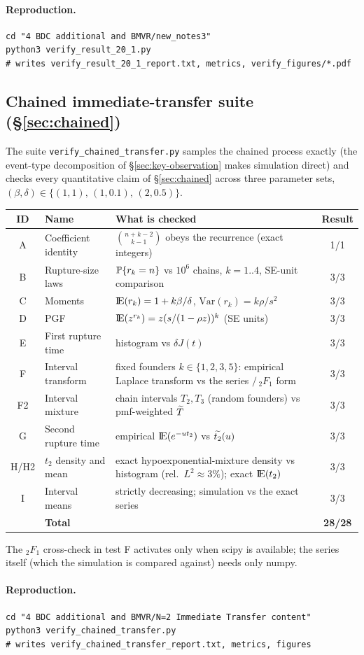 \paragraph{Reproduction.}
\begin{verbatim}
cd "4 BDC additional and BMVR/new_notes3"
python3 verify_result_20_1.py
# writes verify_result_20_1_report.txt, metrics, verify_figures/*.pdf
\end{verbatim}

\subsection{Chained immediate-transfer suite (\S\ref{sec:chained})}

The suite \texttt{verify\_chained\_transfer.py} samples the chained process
exactly (the event-type decomposition of \S\ref{sec:key-observation} makes
simulation direct) and checks every quantitative claim of
\S\ref{sec:chained} across three parameter sets,
$(\beta,\delta)\in\{(1,1),\,(1,0.1),\,(2,0.5)\}$.

\begin{center}
\renewcommand{\arraystretch}{1.2}
\small
\begin{tabular}{@{}clp{}c@{}}
\toprule
ID & Name & What is checked & Result \\
\midrule
A & Coefficient identity &
  $\binom{n+k-2}{k-1}$ obeys the recurrence (exact integers) & 1/1 \\
B & Rupture-size laws &
  $\mathbb{P}\!\left\{r_k=n\right\}$ vs $10^6$ chains, $k=1..4$, SE-unit comparison & 3/3 \\
C & Moments & ${\rm I}\!{\rm E}(r_k)=1+k\beta/\delta$, $\mathrm{Var}(r_k)=k\rho/s^2$ & 3/3 \\
D & PGF & ${\rm I}\!{\rm E}(z^{r_k})=z(s/(1-\rho z))^k$ (SE units) & 3/3 \\
E & First rupture time & histogram vs $\delta J(t)$ & 3/3 \\
F & Interval transform &
  fixed founders $k\in\{1,2,3,5\}$: empirical Laplace transform vs the
  series $/\,{}_2F_1$ form & 3/3 \\
F2 & Interval mixture &
  chain intervals $T_2,T_3$ (random founders) vs pmf-weighted $\widetilde{T}$ & 3/3 \\
G & Second rupture time & empirical ${\rm I}\!{\rm E}(e^{-ut_2})$ vs $\widetilde{t_2}(u)$ & 3/3 \\
H/H2 & $t_2$ density and mean &
  exact hypoexponential-mixture density vs histogram
  (rel.\ $L^2\approx3\%$); exact ${\rm I}\!{\rm E}(t_2)$ & 3/3 \\
I & Interval means &
  strictly decreasing; simulation vs the exact series & 3/3 \\
\midrule
 & \textbf{Total} & & \textbf{28/28} \\
\bottomrule
\end{tabular}
\end{center}
The ${}_2F_1$ cross-check in test F activates only when scipy is available;
the series itself (which the simulation is compared against) needs only
numpy.

\paragraph{Reproduction.}
\begin{verbatim}
cd "4 BDC additional and BMVR/N=2 Immediate Transfer content"
python3 verify_chained_transfer.py
# writes verify_chained_transfer_report.txt, metrics, figures
\end{verbatim}

